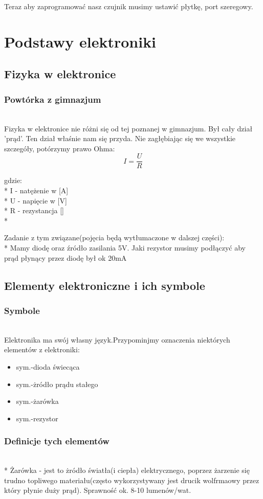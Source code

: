 Teraz aby zaprogramować nasz czujnik musimy ustawić płytkę, port szeregowy.%
\newpage
\section{Podstawy elektroniki}
 \subsection{Fizyka w elektronice}
	\subsubsection{Powtórka z gimnazjum}
	\\Fizyka w elektronice nie różni się od tej poznanej w gimnazjum. Był cały dział 'prąd'. Ten dział właśnie nam się przyda. Nie zagłębiając się we wszystkie szczegóły, potórzymy prawo Ohma:
	\[I=\frac{U}{R}\]

	gdzie:\\*
	I - natężenie w [A] \\*
	U - napięcie w [V] \\*
	R - rezystancja [\Omega] \\*			

Zadanie z tym związane(pojęcia będą wytłumaczone w dalszej części): \\* Mamy diodę oraz źródło zasilania 5V. Jaki rezystor musimy podłączyć aby prąd płynący przez diodę był ok 20mA %
	\subsection{Elementy elektroniczne i ich symbole}
	\subsubsection {Symbole}
	\\Elektronika ma swój własny język.Przypominjmy oznaczenia niektórych elementów z elektroniki:
\begin{itemize}
	\item sym.-dioda świecąca
	\item sym.-żródło prądu stałego
	\item sym.-żarówka
	\item sym.-rezystor
\end{itemize}

   \subsubsection{Definicje tych elementów}
\\* Żarówka - jest to żródło światła(i ciepła) elektrycznego, poprzez żarzenie się trudno topliwego materiału(często wykorzystywany jest drucik wolfrmaowy przez który płynie duży prąd). Sprawność ok.
8-10 lumenów/wat. 

